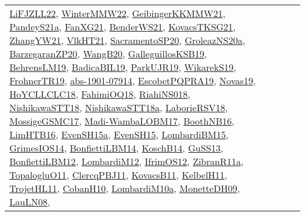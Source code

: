 {\begin{longtable}{lp{3cm}>{\raggedright}p{6cm}>{\raggedright}p{6cm}p{8cm}}
\href{papers/LiFJZLL22.pdf}{LiFJZLL22}\cite{LiFJZLL22}, \href{papers/WinterMMW22.pdf}{WinterMMW22}\cite{WinterMMW22}, \href{papers/GeibingerKKMMW21.pdf}{GeibingerKKMMW21}\cite{GeibingerKKMMW21}, \href{articles/PandeyS21a.pdf}{PandeyS21a}\cite{PandeyS21a}, \href{articles/FanXG21.pdf}{FanXG21}\cite{FanXG21}, \href{papers/BenderWS21.pdf}{BenderWS21}\cite{BenderWS21}, \href{papers/KovacsTKSG21.pdf}{KovacsTKSG21}\cite{KovacsTKSG21}, \href{articles/ZhangYW21.pdf}{ZhangYW21}\cite{ZhangYW21}, \href{articles/VlkHT21.pdf}{VlkHT21}\cite{VlkHT21}, \href{articles/SacramentoSP20.pdf}{SacramentoSP20}\cite{SacramentoSP20}, \href{papers/GroleazNS20a.pdf}{GroleazNS20a}\cite{GroleazNS20a}, \href{papers/BarzegaranZP20.pdf}{BarzegaranZP20}\cite{BarzegaranZP20}, \href{papers/WangB20.pdf}{WangB20}\cite{WangB20}, \href{papers/GalleguillosKSB19.pdf}{GalleguillosKSB19}\cite{GalleguillosKSB19}, \href{papers/BehrensLM19.pdf}{BehrensLM19}\cite{BehrensLM19}, \href{papers/BadicaBIL19.pdf}{BadicaBIL19}\cite{BadicaBIL19}, \href{papers/ParkUJR19.pdf}{ParkUJR19}\cite{ParkUJR19}, \href{articles/WikarekS19.pdf}{WikarekS19}\cite{WikarekS19}, \href{papers/FrohnerTR19.pdf}{FrohnerTR19}\cite{FrohnerTR19}, \href{articles/abs-1901-07914.pdf}{abs-1901-07914}\cite{abs-1901-07914}, \href{articles/EscobetPQPRA19.pdf}{EscobetPQPRA19}\cite{EscobetPQPRA19}, \href{articles/Novas19.pdf}{Novas19}\cite{Novas19}, \href{papers/HoYCLLCLC18.pdf}{HoYCLLCLC18}\cite{HoYCLLCLC18}, \href{articles/FahimiOQ18.pdf}{FahimiOQ18}\cite{FahimiOQ18}, \href{papers/RiahiNS018.pdf}{RiahiNS018}\cite{RiahiNS018}, \href{papers/NishikawaSTT18.pdf}{NishikawaSTT18}\cite{NishikawaSTT18}, \href{papers/NishikawaSTT18a.pdf}{NishikawaSTT18a}\cite{NishikawaSTT18a}, \href{articles/LaborieRSV18.pdf}{LaborieRSV18}\cite{LaborieRSV18}, \href{papers/MossigeGSMC17.pdf}{MossigeGSMC17}\cite{MossigeGSMC17}, \href{papers/Madi-WambaLOBM17.pdf}{Madi-WambaLOBM17}\cite{Madi-WambaLOBM17}, \href{papers/BoothNB16.pdf}{BoothNB16}\cite{BoothNB16}, \href{papers/LimHTB16.pdf}{LimHTB16}\cite{LimHTB16}, \href{articles/EvenSH15a.pdf}{EvenSH15a}\cite{EvenSH15a}, \href{papers/EvenSH15.pdf}{EvenSH15}\cite{EvenSH15}, \href{papers/LombardiBM15.pdf}{LombardiBM15}\cite{LombardiBM15}, \href{articles/GrimesIOS14.pdf}{GrimesIOS14}\cite{GrimesIOS14}, \href{articles/BonfiettiLBM14.pdf}{BonfiettiLBM14}\cite{BonfiettiLBM14}, \href{papers/KoschB14.pdf}{KoschB14}\cite{KoschB14}, \href{papers/GuSS13.pdf}{GuSS13}\cite{GuSS13}, \href{papers/BonfiettiLBM12.pdf}{BonfiettiLBM12}\cite{BonfiettiLBM12}, \href{articles/LombardiM12.pdf}{LombardiM12}\cite{LombardiM12}, \href{papers/IfrimOS12.pdf}{IfrimOS12}\cite{IfrimOS12}, \href{papers/ZibranR11a.pdf}{ZibranR11a}\cite{ZibranR11a}, \href{articles/TopalogluO11.pdf}{TopalogluO11}\cite{TopalogluO11}, \href{papers/ClercqPBJ11.pdf}{ClercqPBJ11}\cite{ClercqPBJ11}, \href{articles/KovacsB11.pdf}{KovacsB11}\cite{KovacsB11}, \href{articles/KelbelH11.pdf}{KelbelH11}\cite{KelbelH11}, \href{articles/TrojetHL11.pdf}{TrojetHL11}\cite{TrojetHL11}, \href{papers/CobanH10.pdf}{CobanH10}\cite{CobanH10}, \href{articles/LombardiM10a.pdf}{LombardiM10a}\cite{LombardiM10a}, \href{papers/MonetteDH09.pdf}{MonetteDH09}\cite{MonetteDH09}, \href{papers/LauLN08.pdf}{LauLN08}\cite{LauLN08}, 
\end{longtable}}
